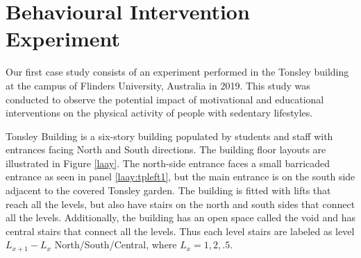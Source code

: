 \section{Behavioural Intervention Experiment}


Our first case study consists of an experiment performed in the Tonsley building at the campus of Flinders University, Australia in 2019. This study was conducted to observe the potential impact of motivational and educational interventions on the physical activity of people with sedentary lifestyles. 








 



Tonsley Building is a six-story building populated by students and staff with entrances facing North and South directions. The building floor layouts are illustrated in Figure \ref{laay}. The north-side entrance faces a small barricaded entrance as seen in panel \ref{laay:tpleft1}, but the main entrance is on the south side adjacent to the covered Tonsley garden. The building is fitted with lifts that reach all the levels, but also have stairs on the north and south sides that connect all the levels. Additionally, the building has an open space called the void and has central stairs that connect all the levels. Thus each level stairs are labeled as level $L_{x+1}-L_x$ North/South/Central, where $L_x = 1,2,.5$. 


